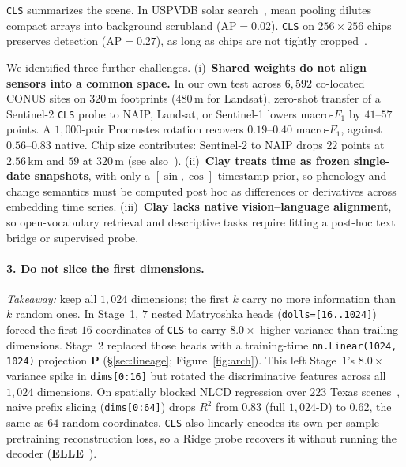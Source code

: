 \texttt{CLS} summarizes the scene. In USPVDB solar search~\cite{fujita2023uspvdb}, mean pooling dilutes compact arrays into background scrubland ($\text{AP} = 0.02$). \texttt{CLS} on $256\times 256$ chips preserves detection ($\text{AP} = 0.27$), as long as chips are not tightly cropped~\cite{corley2024resize}.

We identified three further challenges. (i)~\textbf{Shared weights do not align sensors into a common space.} In our own test across $6{,}592$ co-located CONUS sites on $320\,\text{m}$ footprints ($480\,\text{m}$ for Landsat), zero-shot transfer of a Sentinel-2 \texttt{CLS} probe to NAIP, Landsat, or Sentinel-1 lowers macro-$F_1$ by $41\text{--}57$ points. A $1{,}000$-pair Procrustes rotation recovers $0.19\text{--}0.40$ macro-$F_1$, against $0.56\text{--}0.83$ native. Chip size contributes: Sentinel-2 to NAIP drops $22$ points at $2.56\,\text{km}$ and $59$ at $320\,\text{m}$ (see also~\cite{tamazyan2025geocrossbench,marsocci2025xstars}). (ii)~\textbf{Clay treats time as frozen single-date snapshots}, with only a $[\sin,\cos]$ timestamp prior, so phenology and change semantics must be computed post hoc as differences or derivatives across embedding time series. (iii)~\textbf{Clay lacks native vision--language alignment}, so open-vocabulary retrieval and descriptive tasks require fitting a post-hoc text bridge or supervised probe.

\paragraph{3. Do not slice the first dimensions.}
\emph{Takeaway:} keep all $1{,}024$ dimensions; the first $k$ carry no more information than $k$ random ones. \label{sec:lesson_mrl}
In Stage~1, $7$ nested Matryoshka heads (\texttt{dolls=[16..1024]}) forced the first $16$ coordinates of \texttt{CLS} to carry $8.0\times$ higher variance than trailing dimensions. Stage~2 replaced those heads with a training-time \texttt{nn.Linear(1024, 1024)} projection $\bm{P}$ (\S\ref{sec:lineage}; Figure~\ref{fig:arch}). This left Stage~1's $8.0\times$ variance spike in \texttt{dims[0:16]} but rotated the discriminative features across all $1{,}024$ dimensions. On spatially blocked NLCD regression over $223$ Texas scenes~\cite{dewitz2023nlcd}, naive prefix slicing (\texttt{dims[0:64]}) drops $R^2$ from $0.83$ (full $1{,}024\text{-D}$) to $0.62$, the same as $64$ random coordinates. \texttt{CLS} also linearly encodes its own per-sample pretraining reconstruction loss, so a Ridge probe recovers it without running the decoder (\textbf{ELLE}~\cite{nuno2026elle}).

